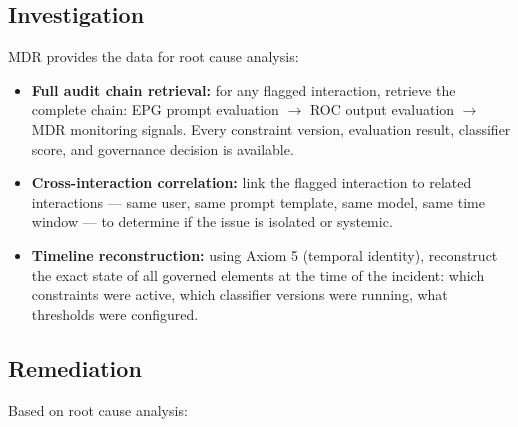 \subsection{Investigation}


MDR provides the data for root cause analysis:

\begin{itemize}
  \item \textbf{Full audit chain retrieval:} for any flagged interaction, retrieve the complete chain: EPG prompt evaluation $\to$ ROC output evaluation $\to$ MDR monitoring signals. Every constraint version, evaluation result, classifier score, and governance decision is available.
  \item \textbf{Cross-interaction correlation:} link the flagged interaction to related interactions --- same user, same prompt template, same model, same time window --- to determine if the issue is isolated or systemic.
  \item \textbf{Timeline reconstruction:} using Axiom 5 (temporal identity), reconstruct the exact state of all governed elements at the time of the incident: which constraints were active, which classifier versions were running, what thresholds were configured.
\end{itemize}


\subsection{Remediation}


Based on root cause analysis:

